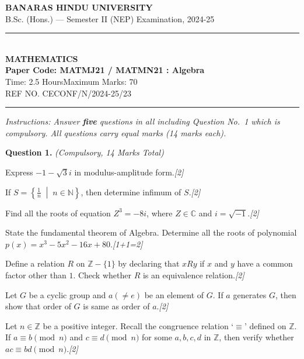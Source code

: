 \documentclass[11pt,a4paper]{article}
\newcommand{\pts}[1]{\hfill\textit{[#1]}}
\begin{document}
\begin{center}
  {\large\bfseries BANARAS HINDU UNIVERSITY}\\[2pt]
  {\normalsize B.Sc. (Hons.) --- Semester II (NEP) Examination, 2024-25}\\[6pt]
  \rule{0.8\linewidth}{0.5pt}\\[6pt]
  {\large\bfseries MATHEMATICS}\\[4pt]
  {\large\bfseries Paper Code: MATMJ21 / MATMN21 : Algebra}\\[4pt]
  {\normalsize Time: 2.5 Hours\hfill Maximum Marks: 70}\\[2pt]
  {\small REF NO. CECONF/N/2024-25/23}
\end{center}

\rule{\linewidth}{0.4pt}

\smallskip
\noindent\textit{Instructions: Answer \textbf{five} questions in all including Question No.~1 which is compulsory. All questions carry equal marks (14 marks each).}

\bigskip

\noindent\textbf{Question 1.} \textit{(Compulsory, 14 Marks Total)}
\begin{parts}
  \item Express $-1 - \sqrt{3}i$ in modulus-amplitude form.\pts{2}
  \item If $S = \left\{ \frac{1}{n} \;\middle|\; n \in \mathbb{N} \right\}$, then determine infimum of $S$.\pts{2}
  \item Find all the roots of equation $Z^3 = -8i$, where $Z \in \mathbb{C}$ and $i = \sqrt{-1}$.\pts{2}
  \item State the fundamental theorem of Algebra. Determine all the roots of polynomial $p(x) = x^3 - 5x^2 - 16x + 80$.\pts{1+1=2}
  \item Define a relation $R$ on $\mathbb{Z} - \{1\}$ by declaring that $xRy$ if $x$ and $y$ have a common factor other than $1$. Check whether $R$ is an equivalence relation.\pts{2}
  \item Let $G$ be a cyclic group and $a (\neq e)$ be an element of $G$. If $a$ generates $G$, then show that order of $G$ is same as order of $a$.\pts{2}
  \item Let $n \in \mathbb{Z}$ be a positive integer. Recall the congruence relation `$\equiv$' defined on $\mathbb{Z}$. If $a \equiv b \pmod n$ and $c \equiv d \pmod n$ for some $a, b, c, d$ in $\mathbb{Z}$, then verify whether $ac \equiv bd \pmod n$.\pts{2}
\end{parts}
\end{document}
